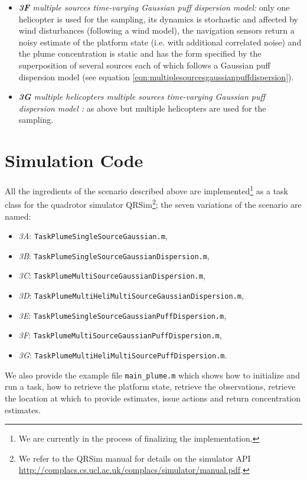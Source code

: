 \documentclass[a4paper,11pt]{report}
\newcommand{\sname}{QRSim\xspace}
\newcommand{\webman}{\url{http://complacs.cs.ucl.ac.uk/complacs/simulator/manual.pdf}\xspace}
\newcommand\mytexttt[1]{\texttt{\hyphenchar\font=45\relax #1}}
\begin{document}
\begin{itemize}
\item \textit{\textbf{3F} multiple sources time-varying Gaussian puff dispersion model:} only one helicopter is used for the sampling, its dynamics is stochastic and affected by wind disturbances (following a wind model), the navigation sensors return a noisy estimate of the platform state (i.e. with additional correlated noise) and the plume concentration is static and has the form specified by the superposition of several sources each of which follows a Gaussian puff dispersion model (see equation \ref{eqn:multiplesourcesgaussianpuffdispersion}).

\item \textit{\textbf{3G} multiple helicopters multiple sources time-varying Gaussian puff dispersion model :} as above but multiple helicopters are used for the sampling.

\end{itemize}
 

\section{Simulation Code} \label{PlumeSim}

All the ingredients of the scenario described above are implemented\footnote{We are currently in the process of finalizing the implementation.} as a task class for the quadrotor simulator \sname\footnote{We refer to the \sname manual for details on the simulator API \webman.}; the seven variations of the scenario are named:
\begin{itemize}
\item\textit{3A}: \mytexttt{TaskPlumeSingleSourceGaussian.m}, 
\item\textit{3B}: \mytexttt{TaskPlumeSingleSourceGaussianDispersion.m},
\item\textit{3C}: \mytexttt{TaskPlumeMultiSourceGaussianDispersion.m}, 
\item\textit{3D}: \mytexttt{TaskPlumeMultiHeliMultiSourceGaussianDispersion.m}, 
\item\textit{3E}: \mytexttt{TaskPlumeSingleSourceGaussianPuffDispersion.m}, 
\item\textit{3F}: \mytexttt{TaskPlumeMultiSourceGaussianPuffDispersion.m},
\item\textit{3G}: \mytexttt{TaskPlumeMultiHeliMultiSourcePuffDispersion.m}. 
\end{itemize}

We also provide the example file \texttt{main\_plume.m} which shows how to initialize and run a task, how to retrieve the platform state, retrieve the observations, retrieve the location at which to provide estimates, issue actions and return concentration estimates.
\end{document}

